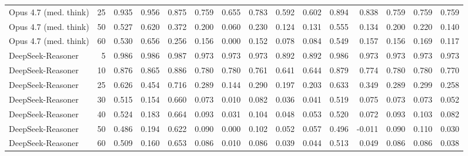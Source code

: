\documentclass[acmsmall,screen,review,anonymous]{acmart}
\begin{document}
\begin{landscape}
\begin{longtable}{p{4.1cm}r*{13}{r}}
Opus 4.7 (med. think) & 25 & 0.935 & 0.956 & 0.875 & 0.759 & 0.655 & 0.783 & 0.592 & 0.602 & 0.894 & 0.838 & 0.759 & 0.759 & 0.759 \\
Opus 4.7 (med. think) & 50 & 0.527 & 0.620 & 0.372 & 0.200 & 0.060 & 0.230 & 0.124 & 0.131 & 0.555 & 0.134 & 0.200 & 0.220 & 0.140 \\
Opus 4.7 (med. think) & 60 & 0.530 & 0.656 & 0.256 & 0.156 & 0.000 & 0.152 & 0.078 & 0.084 & 0.549 & 0.157 & 0.156 & 0.169 & 0.117 \\
DeepSeek-Reasoner & 5 & 0.986 & 0.986 & 0.987 & 0.973 & 0.973 & 0.973 & 0.892 & 0.892 & 0.986 & 0.973 & 0.973 & 0.973 & 0.973 \\
DeepSeek-Reasoner & 10 & 0.876 & 0.865 & 0.886 & 0.780 & 0.780 & 0.761 & 0.641 & 0.644 & 0.879 & 0.774 & 0.780 & 0.780 & 0.770 \\
DeepSeek-Reasoner & 25 & 0.626 & 0.454 & 0.716 & 0.289 & 0.144 & 0.290 & 0.197 & 0.203 & 0.633 & 0.349 & 0.289 & 0.299 & 0.258 \\
DeepSeek-Reasoner & 30 & 0.515 & 0.154 & 0.660 & 0.073 & 0.010 & 0.082 & 0.036 & 0.041 & 0.519 & 0.075 & 0.073 & 0.073 & 0.052 \\
DeepSeek-Reasoner & 40 & 0.524 & 0.183 & 0.664 & 0.093 & 0.031 & 0.104 & 0.048 & 0.053 & 0.520 & 0.072 & 0.093 & 0.103 & 0.082 \\
DeepSeek-Reasoner & 50 & 0.486 & 0.194 & 0.622 & 0.090 & 0.000 & 0.102 & 0.052 & 0.057 & 0.496 & -0.011 & 0.090 & 0.110 & 0.030 \\
DeepSeek-Reasoner & 60 & 0.509 & 0.160 & 0.653 & 0.086 & 0.010 & 0.086 & 0.039 & 0.044 & 0.513 & 0.049 & 0.086 & 0.086 & 0.038 \\
\end{longtable}
\end{landscape}
\end{document}
